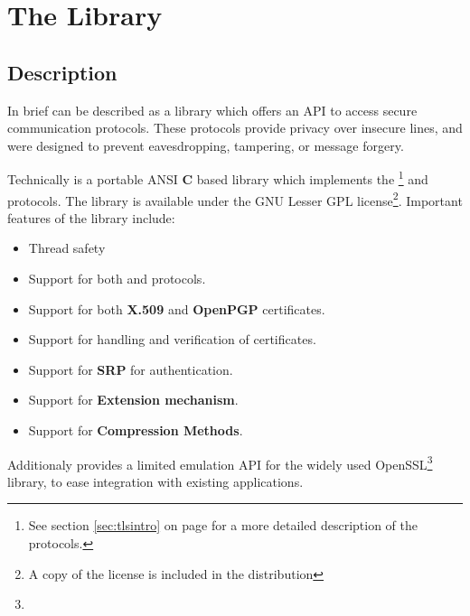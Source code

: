\chapter{The Library}

\section{Description}
\par
In brief \gnutls{} can be described as a library which offers
an API to access secure communication protocols. These protocols provide
privacy over insecure lines, and were designed to prevent 
eavesdropping, tampering, or message forgery.

\par
Technically \gnutls{} is a portable ANSI {\bf C} based library which implements the 
\tlsI{}\footnote{See section \ref{sec:tlsintro} on page \pageref{sec:tlsintro} for
a more detailed description of the protocols.} and \sslIII{} protocols. 
The library is available under the GNU Lesser GPL license\footnote{A copy of the license is included
in the distribution}.
Important features of the \gnutls{} library include:

\begin{itemize}
\item Thread safety
\item Support for both \tlsI{} and \sslIII{} protocols.
\item Support for both {\bf X.509} and {\bf OpenPGP} certificates.
\item Support for handling and verification of certificates.
\item Support for {\bf SRP} for \tls{} authentication.
\item Support for \tls{} {\bf Extension mechanism}.
\item Support for \tls{} {\bf Compression Methods}.
\end{itemize}

Additionaly \gnutls{} provides a limited emulation API for the widely used
OpenSSL\footnote{} 
library, to ease integration with existing applications.

